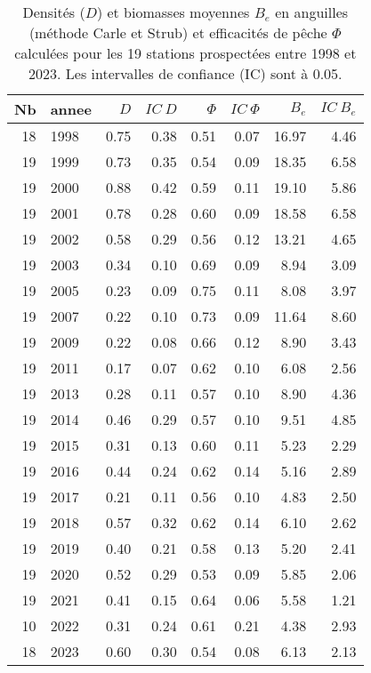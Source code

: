 \begin{table}[htbp]
\centering
\caption[Densités et biomasses.]{Densités ($D$) et biomasses moyennes $B_e$ en anguilles (méthode Carle et Strub) et efficacités de pêche $\Phi$ calculées pour
								les 19 stations prospectées entre 1998 et 2023. Les intervalles de confiance (IC) sont
								à 0.05.} 
\label{tableau2_dens_eff_annee}
\begin{tabular}{rlrrrrrr}
  \hline
Nb & annee & $D$ & $IC~D$ & $\Phi$ & $IC~\Phi$ & $B_e$ & $IC~B_e$ \\ 
  \hline
 18 & 1998 & 0.75 & 0.38 & 0.51 & 0.07 & 16.97 & 4.46 \\ 
   19 & 1999 & 0.73 & 0.35 & 0.54 & 0.09 & 18.35 & 6.58 \\ 
   19 & 2000 & 0.88 & 0.42 & 0.59 & 0.11 & 19.10 & 5.86 \\ 
   19 & 2001 & 0.78 & 0.28 & 0.60 & 0.09 & 18.58 & 6.58 \\ 
   19 & 2002 & 0.58 & 0.29 & 0.56 & 0.12 & 13.21 & 4.65 \\ 
   19 & 2003 & 0.34 & 0.10 & 0.69 & 0.09 & 8.94 & 3.09 \\ 
   19 & 2005 & 0.23 & 0.09 & 0.75 & 0.11 & 8.08 & 3.97 \\ 
   19 & 2007 & 0.22 & 0.10 & 0.73 & 0.09 & 11.64 & 8.60 \\ 
   19 & 2009 & 0.22 & 0.08 & 0.66 & 0.12 & 8.90 & 3.43 \\ 
   19 & 2011 & 0.17 & 0.07 & 0.62 & 0.10 & 6.08 & 2.56 \\ 
   19 & 2013 & 0.28 & 0.11 & 0.57 & 0.10 & 8.90 & 4.36 \\ 
   19 & 2014 & 0.46 & 0.29 & 0.57 & 0.10 & 9.51 & 4.85 \\ 
   19 & 2015 & 0.31 & 0.13 & 0.60 & 0.11 & 5.23 & 2.29 \\ 
   19 & 2016 & 0.44 & 0.24 & 0.62 & 0.14 & 5.16 & 2.89 \\ 
   19 & 2017 & 0.21 & 0.11 & 0.56 & 0.10 & 4.83 & 2.50 \\ 
   19 & 2018 & 0.57 & 0.32 & 0.62 & 0.14 & 6.10 & 2.62 \\ 
   19 & 2019 & 0.40 & 0.21 & 0.58 & 0.13 & 5.20 & 2.41 \\ 
   19 & 2020 & 0.52 & 0.29 & 0.53 & 0.09 & 5.85 & 2.06 \\ 
   19 & 2021 & 0.41 & 0.15 & 0.64 & 0.06 & 5.58 & 1.21 \\ 
   10 & 2022 & 0.31 & 0.24 & 0.61 & 0.21 & 4.38 & 2.93 \\ 
   18 & 2023 & 0.60 & 0.30 & 0.54 & 0.08 & 6.13 & 2.13 \\ 
   \hline
\end{tabular}
\end{table}
